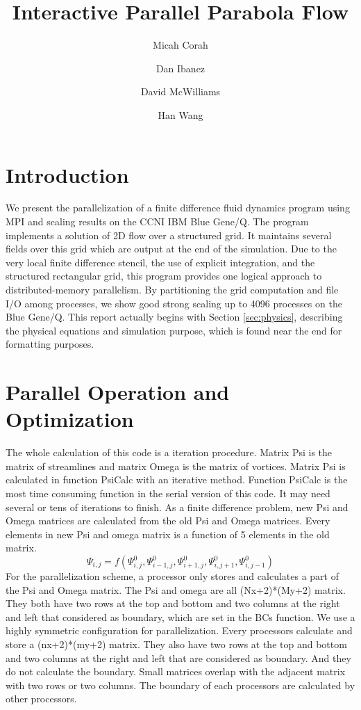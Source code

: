 \documentclass[twocolumn]{article}
\title{Interactive Parallel Parabola Flow}
\author{
Micah Corah
\and
Dan Ibanez
\and
David McWilliams
\and
Han Wang
}
\begin{document}
\maketitle
\section{Introduction}

We present the parallelization of a finite difference fluid dynamics
program using MPI and scaling results on the CCNI IBM
Blue Gene/Q.
The program implements a solution of 2D flow over a structured grid.
It maintains several fields over this grid which are output at
the end of the simulation.
Due to the very local finite difference stencil, the use of explicit
integration, and the structured rectangular grid,
this program provides one logical approach to distributed-memory
parallelism.
By partitioning the grid computation
and file I/O among processes, we show
good strong scaling up to 4096 processes on the Blue Gene/Q.
This report actually begins with Section \ref{sec:physics},
describing the physical equations and simulation purpose,
which is found near the end for formatting purposes.

\section{Parallel Operation and Optimization}

The whole calculation of this code is a iteration procedure.
Matrix Psi is the matrix of streamlines and matrix Omega is the matrix of vortices.
Matrix Psi is calculated in function PsiCalc with an iterative method.
Function PsiCalc is the most time consuming function in the serial version
of this code.
It may need several or tens of iterations to finish.
As a finite difference problem, new Psi and Omega matrices are calculated from
the old Psi and Omega matrices.
Every elements in new Psi and omega matrix is a function of 5 elements in the old
matrix.
\[\Psi_{i,j}=f(\Psi^0_{i,j},\Psi^0_{i-1,j},\Psi^0_{i+1,j},\Psi^0_{i,j+1},\Psi^0_{i,j-1})\]
For the parallelization scheme, a processor only stores and calculates a part
of the Psi and Omega matrix.
The Psi and omega are all (Nx+2)*(My+2) matrix.
They both have two rows at the top and bottom and two columns at the right
and left that considered as boundary, which are set in the BCs function.
We use a highly symmetric configuration for parallelization.
Every processors calculate and store a (nx+2)*(my+2) matrix.
They also have  two rows at the top and bottom and two columns at the right
and left that are considered as boundary.
And they do not calculate the boundary.
Small matrices  overlap with the adjacent matrix with two rows or two columns.
The boundary of each processors are calculated by other processors.
\end{document}
